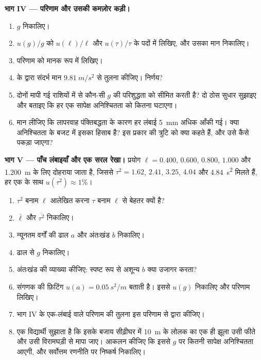 \begin{problem}
\medskip
\noindent\textbf{भाग IV --- परिणाम और उसकी कमज़ोर कड़ी।}
\begin{enumerate}[resume]
  \item $g$ निकालिए।
  \item $u(g)/g$ को $u(\ell)/\ell$ और $u(\tau)/\tau$ के पदों में लिखिए, और
        उसका मान निकालिए।
  \item परिणाम को मानक रूप में लिखिए।
  \item {} के द्वारा संदर्भ मान $\qty{9.81}{m/s^2}$ से
        तुलना कीजिए। निर्णय?
  \item दोनों मापी गई राशियों में से कौन-सी $g$ की परिशुद्धता को सीमित करती
        है? दो ठोस सुधार सुझाइए और बताइए कि हर एक सापेक्ष अनिश्चितता को कितना
        घटाएगा।
  \item मान लीजिए कि लापरवाह पंक्तिबद्धता के कारण हर लंबाई \qty{5}{mm} अधिक
        आँकी गई। क्या अनिश्चितता के बजट में इसका हिसाब है? इस प्रकार की
        त्रुटि को क्या कहते हैं, और उसे कैसे पकड़ा जाएगा?
\end{enumerate}

\medskip
\noindent\textbf{भाग V --- पाँच लंबाइयाँ और एक सरल रेखा।}
प्रयोग $\ell = 0.400$, $0.600$, $0.800$, $1.000$ और \qty{1.200}{m} के लिए
दोहराया जाता है, जिससे $\tau^2 = 1.62$, $2.41$, $3.25$, $4.04$ और
\qty{4.84}{s^2} मिलते हैं, हर एक के साथ $u(\tau^2) \approx 1\%$।
\begin{enumerate}[resume]
  \item $\tau^2$ बनाम $\ell$ आलेखित करना $\tau$ बनाम $\ell$ से बेहतर क्यों है?
  \item $\bar\ell$ और $\overline{\tau^2}$ निकालिए।
  \item न्यूनतम वर्गों की ढाल $a$ और अंतःखंड $b$ निकालिए।
  \item ढाल से $g$ निकालिए।
  \item अंतःखंड की व्याख्या कीजिए: स्पष्ट रूप से अशून्य $b$ क्या उजागर करता?
  \item संगणक की फ़िटिंग $u(a) = \qty{0.05}{s^2/m}$ बताती है। इससे $u(g)$
        निकालिए और परिणाम लिखिए।
  \item भाग IV के एक-लंबाई वाले परिणाम की तुलना इस परिणाम से
         द्वारा कीजिए।
  \item एक विद्यार्थी सुझाता है कि इसके बजाय सीढ़ीघर में \qty{10}{m} के लोलक
        का एक ही झूला उसी फीते और उसी विरामघड़ी से मापा जाए। आकलन कीजिए कि
        इससे $g$ पर कितनी सापेक्ष अनिश्चितता आएगी, और सर्वोत्तम रणनीति पर
        निष्कर्ष निकालिए।
\end{enumerate}
\end{problem}
